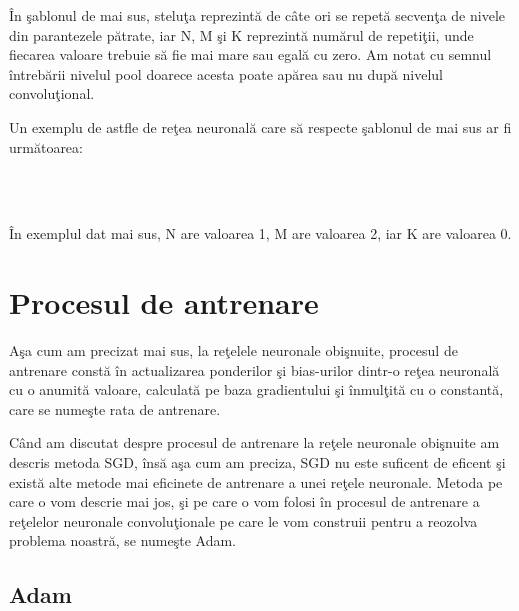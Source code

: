 \^{I}n \c{s}ablonul de mai sus, stelu\c{t}a reprezint\u{a} de c\^{a}te ori se repet\u{a} secven\c{t}a de nivele din parantezele p\u{a}trate, iar N, M \c{s}i K reprezint\u{a} num\u{a}rul de repeti\c{t}ii, unde fiecarea valoare trebuie s\u{a} fie mai mare sau egal\u{a} cu zero. Am notat cu semnul \^{i}ntreb\u{a}rii nivelul pool doarece acesta poate ap\u{a}rea sau nu dup\u{a} nivelul convolu\c{t}ional.

\par

Un exemplu de astfle de re\c{t}ea neuronal\u{a} care s\u{a} respecte \c{s}ablonul de mai sus ar fi urm\u{a}toarea:

 \longrightarrow {} \longrightarrow {} \longrightarrow {} \longrightarrow \\ 
\longrightarrow {} \longrightarrow {} \longrightarrow {} \longrightarrow \\ 
\longrightarrow  {} \longrightarrow {}

\^{I}n exemplul dat mai sus, N are valoarea 1, M are valoarea 2, iar K are valoarea 0.

\section{Procesul de antrenare}

A\c{s}a cum am precizat mai sus, la re\c{t}elele neuronale obi\c{s}nuite, procesul de antrenare const\u{a} \^{i}n actualizarea ponderilor \c{s}i bias-urilor dintr-o re\c{t}ea neuronal\u{a} cu o anumit\u{a} valoare, calculat\u{a} pe baza gradientului \c{s}i \^{i}nmul\c{t}it\u{a} cu o constant\u{a}, care se nume\c{s}te rata de antrenare.

C\^{a}nd am discutat despre procesul de antrenare la re\c{t}ele neuronale obi\c{s}nuite am descris metoda SGD, \^{i}ns\u{a} a\c{s}a cum am preciza, SGD nu este suficent de eficent \c{s}i exist\u{a} alte metode mai eficinete de antrenare a unei re\c{t}ele neuronale. Metoda pe care o vom descrie mai jos, \c{s}i pe care o vom folosi \^{i}n procesul de antrenare a re\c{t}elelor neuronale convolu\c{t}ionale pe care le vom construii pentru a reozolva problema noastr\u{a}, se nume\c{s}te Adam.

\subsection{Adam}

